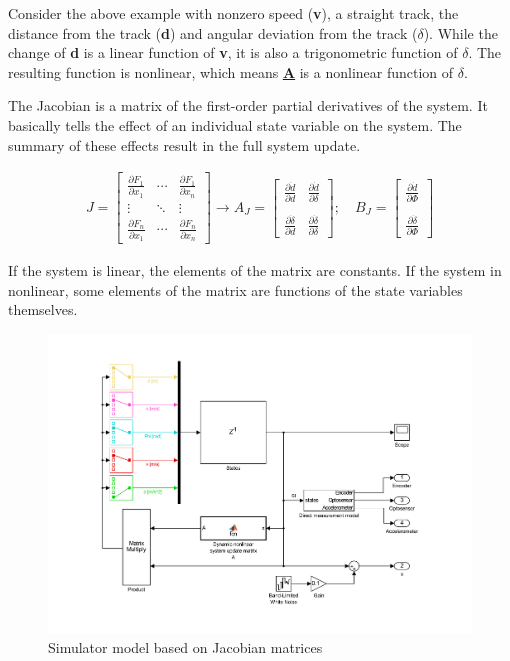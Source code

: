 Consider the above example with nonzero speed (\textbf{v}), a straight track, the distance from the track (\textbf{d}) and angular deviation from the track ($\delta$). While the change of \textbf{d} is a linear function of \textbf{v}, it is also a trigonometric function of $\delta$. The resulting function is nonlinear, which means \textbf{\underline{\underline{A}}} is a nonlinear function of $\delta$. 

The Jacobian is a matrix of the first-order partial derivatives of the system\cite[p. 294]{jacobian}. It basically tells the effect of an individual state variable on the system. The summary of these effects result in the full system update.

\begin{align}
J =
		 \begin{bmatrix}
		  \frac{\partial F_1}{\partial x_1} & \cdots & \frac{\partial F_1}{\partial x_n} \\
		  \vdots  & \ddots & \vdots  \\
		  \frac{\partial F_n}{\partial x_1} & \cdots & \frac{\partial F_n}{\partial x_n}
		 \end{bmatrix}
\longrightarrow
 A_J =
		 \begin{bmatrix}
           \frac{\partial \dot{d}}{\partial d} & \frac{\partial \dot{d}}{\partial \delta} \\
           & \\
           \frac{\partial \dot{\delta}}{\partial d} & \frac{\partial \dot{\delta}}{\partial \delta}
         \end{bmatrix}
; \quad
B_J =
         \begin{bmatrix}
               \frac{\partial \dot{d}}{\partial \Phi} \\
               \\
               \frac{\partial \dot{\delta}}{\partial \Phi}
         \end{bmatrix}
\end{align}

If the system is linear, the elements of the matrix are constants. If the system in nonlinear, some elements of the matrix are functions of the state variables themselves.

\begin{figure}[!ht]
    \centering
    \includegraphics[width=0.7\linewidth]{img/sys}
    \centering
    \vspace{-30pt}
    \caption{Simulator model based on Jacobian matrices}
    \label{fig:model}
\end{figure}

